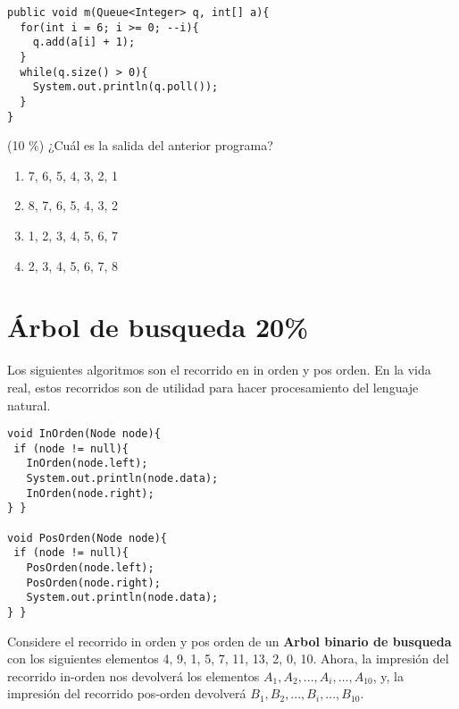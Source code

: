 \documentclass[twocolumn]{article}
\begin{document}
\begin{verbatim}
public void m(Queue<Integer> q, int[] a){
  for(int i = 6; i >= 0; --i){
    q.add(a[i] + 1);	
  }
  while(q.size() > 0){
    System.out.println(q.poll());	
  }
}
\end{verbatim}

(10 \%) ¿Cuál es la salida del anterior programa?\\

\begin{enumerate}[label=\Alph*.]
\item 7, 6, 5, 4, 3, 2, 1
\item 8, 7, 6, 5, 4, 3, 2
\item 1, 2, 3, 4, 5, 6, 7
\item 2, 3, 4, 5, 6, 7, 8
\end{enumerate}

\section{Árbol de busqueda 20\%}
Los siguientes algoritmos son el recorrido en in orden y pos orden. En la vida real, estos recorridos son de utilidad para hacer procesamiento del lenguaje natural.

\begin{verbatim}
void InOrden(Node node){
 if (node != null){
   InOrden(node.left);
   System.out.println(node.data);
   InOrden(node.right);
} }

void PosOrden(Node node){
 if (node != null){
   PosOrden(node.left);
   PosOrden(node.right);
   System.out.println(node.data);
} }
\end{verbatim}

Considere el recorrido in orden y pos orden de un \textbf{Arbol binario de busqueda} con los siguientes elementos 4, 9, 1, 5, 7, 11, 13, 2, 0, 10. Ahora, la impresión del recorrido in-orden nos devolverá los elementos $A_1, A_2, ..., A_i, ..., A_{10}$, y, la impresión del recorrido pos-orden devolverá $B_1, B_2, ..., B_i, ..., B_{10}$.
\\
\begin{center}
\end{center}
\end{document}
